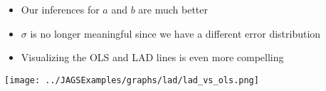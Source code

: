 \documentclass{beamer}
\begin{document}
\frame
{
  \begin{itemize}
    \item{Our inferences for $a$ and $b$ are much better}
    \item{$\sigma$ is no longer meaningful since we have a different error distribution}
  \end{itemize}
}

\begin{frame}
  \begin{itemize}
    \item{Visualizing the OLS and LAD lines is even more compelling}
  \end{itemize}
\end{frame}

%
%

\begin{frame}[fragile]
  \begin{center}
    \texttt{[image: ../JAGSExamples/graphs/lad/lad\_vs\_ols.png]}
  \end{center}
\end{frame}


\end{document}
